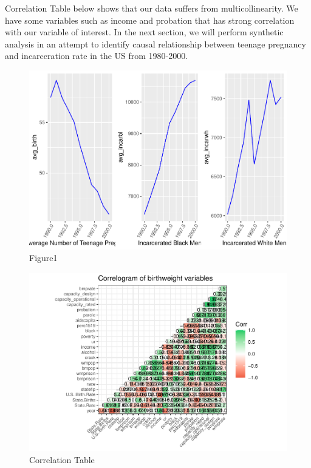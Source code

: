 \documentclass[
]{article}
\begin{document}
Correlation Table below shows that our data suffers from
multicollinearity. We have some variables such as income and probation
that has strong correlation with our variable of interest. In the next
section, we will perform synthetic analysis in an attempt to identify
causal relationship between teenage pregnancy and incarceration rate in
the US from 1980-2000.

\begin{figure}
\centering
\includegraphics{causal_Inf_final2_files/figure-latex/unnamed-chunk-1-1.pdf}
\caption{Figure1}
\end{figure}

\begin{figure}
\centering
\includegraphics{causal_Inf_final2_files/figure-latex/unnamed-chunk-2-1.pdf}
\caption{Correlation Table}
\end{figure}
\end{document}
